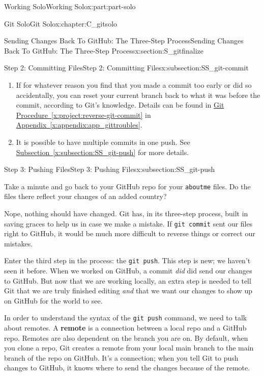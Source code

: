 \documentclass[oneside,10pt,]{book}
\newcommand{\xreffont}{\relax}
\newcommand{\mono}[1]{\texttt{#1}}
\newcommand{\terminology}[1]{\textbf{#1}}
\begin{document}
\begin{partptx}{Working Solo}{}{Working Solo}{}{}{x:part:part-solo}
\begin{chapterptx}{Git Solo}{}{Git Solo}{}{}{x:chapter:C_gitsolo}
\begin{sectionptx}{Sending Changes Back To GitHub: The Three-Step Process}{}{Sending Changes Back To GitHub: The Three-Step Process}{}{}{x:section:S_gitfinalize}
\begin{subsectionptx}{Step 2: Committing Files}{}{Step 2: Committing Files}{}{}{x:subsection:SS_git-commit}
\begin{enumerate}
\item{}If for whatever reason you find that you made a commit too early or did so accidentally, you can reset your current branch back to what it was before the commit, according to Git's knowledge. Details can be found in \hyperref[x:project:reverse-git-commit]{Git Procedure~{\xreffont\ref{x:project:reverse-git-commit}}} in \hyperref[x:appendix:app_gittroubles]{Appendix~{\xreffont\ref{x:appendix:app_gittroubles}}}.%
\item{}It is possible to have multiple commits in one push. See \hyperref[x:subsection:SS_git-push]{Subsection~{\xreffont\ref{x:subsection:SS_git-push}}} for more details.%
\end{enumerate}
%
\end{subsectionptx}
%
%
\typeout{************************************************}
\typeout{************************************************}
%
\begin{subsectionptx}{Step 3: Pushing Files}{}{Step 3: Pushing Files}{}{}{x:subsection:SS_git-push}
%
%
%
%
%
%
\begin{introduction}{}%
Take a minute and go back to your GitHub repo for your \mono{aboutme} files. Do the files there reflect your changes of an added country?%
\par
Nope, nothing should have changed. Git has, in its three-step process, built in saving graces to help us in case we make a mistake. If \mono{git commit} sent our files right to GitHub, it would be much more difficult to reverse things or correct our mistakes.%
\par
Enter the third step in the process: the \mono{git push}. This step is new; we haven't seen it before. When we worked on GitHub, a commit \emph{did} did send our changes to GitHub. But now that we are working locally, an extra step is needed to tell Git that we are truly finished editing \emph{and} that we want our changes to show up on GitHub for the world to see.%
\end{introduction}%
In order to understand the syntax of the \mono{git push} command, we need to talk about remotes. A \terminology{remote} is a connection between a local repo and a GitHub repo. Remotes are also dependent on the branch you are on. By default, when you clone a repo, Git creates a remote from your local main branch to the main branch of the repo on GitHub. It's a connection; when you tell Git to push changes to GitHub, it knows where to send the changes because of the remote.%

\end{subsectionptx}
\end{sectionptx}
\end{chapterptx}
\end{partptx}
\end{document}
